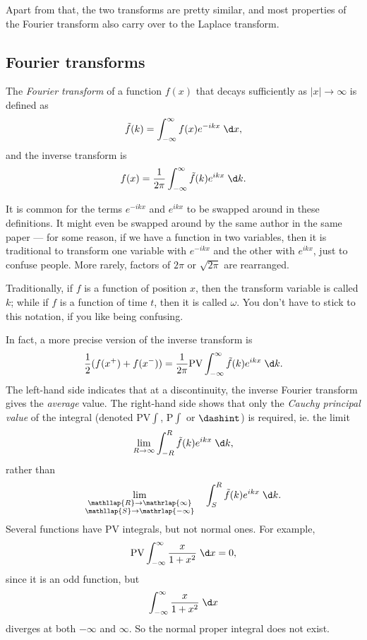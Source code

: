 \documentclass[a4paper]{article}
\begin{document}
Apart from that, the two transforms are pretty similar, and most properties of the Fourier transform also carry over to the Laplace transform.

\subsection{Fourier transforms}
\begin{defi}
  The \emph{Fourier transform} of a function $f(x)$ that decays sufficiently as $|x| \to \infty$ is defined as
  \[
    \tilde{f}(k) = \int_{-\infty}^\infty f(x)e^{-ikx}\;\d x,
  \]
  and the inverse transform is
  \[
    f(x) = \frac{1}{2\pi} \int_{-\infty}^\infty \tilde{f}(k) e^{ikx}\;\d k.
  \]
\end{defi}
It is common for the terms $e^{-ikx}$ and $e^{ikx}$ to be swapped around in these definitions. It might even be swapped around by the same author in the same paper --- for some reason, if we have a function in two variables, then it is traditional to transform one variable with $e^{-ikx}$ and the other with $e^{ikx}$, just to confuse people. More rarely, factors of $2\pi$ or $\sqrt{2\pi}$ are rearranged.

Traditionally, if $f$ is a function of position $x$, then the transform variable is called $k$; while if $f$ is a function of time $t$, then it is called $\omega$. You don't have to stick to this notation, if you like being confusing.

In fact, a more precise version of the inverse transform is
\[
  \frac{1}{2}(f(x^+) + f(x^-)) = \frac{1}{2\pi} \mathrm{PV} \int_{-\infty}^\infty \tilde{f}(k) e^{ikx}\;\d k.
\]
The left-hand side indicates that at a discontinuity, the inverse Fourier transform gives the \emph{average} value. The right-hand side shows that only the \emph{Cauchy principal value} of the integral (denoted $\mathrm{PV} \int$, $\mathrm{P}\int$ or $\dashint$) is required, ie. the limit
\[
  \lim_{R \to \infty} \int_{-R}^R \tilde{f}(k) e^{ikx} \;\d k,
\]
rather than
\[
  \lim_{\substack{\mathllap{R} \to \mathrlap{\infty} \\ \mathllap{S}\to \mathrlap{-\infty}}}\quad \int_S^R\tilde{f}(k) e^{ikx} \;\d k.
\]
Several functions have $\mathrm{PV}$ integrals, but not normal ones. For example,
\[
  \mathrm{PV} \int_{-\infty}^\infty \frac{x}{1 + x^2}\;\d x = 0,
\]
since it is an odd function, but
\[
  \int_{-\infty}^\infty \frac{x}{1 + x^2}\;\d x
\]
diverges at both $-\infty$ and $\infty$. So the normal proper integral does not exist.
\end{document}
